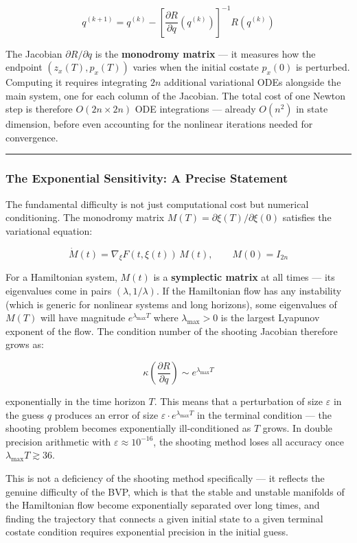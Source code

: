 \documentclass{article}
\begin{document}
$$q^{(k+1)} = q^{(k)} - \left[\frac{\partial R}{\partial q}(q^{(k)})\right]^{-1} R(q^{(k)})$$

\begin{tldrbox}
The Jacobian $\partial R / \partial q$ is the \textbf{monodromy matrix} — it measures how the endpoint $(z_x(T), p_x(T))$ varies when the initial costate $p_x(0)$ is perturbed. Computing it requires integrating $2n$ additional variational ODEs alongside the main system, one for each column of the Jacobian. The total cost of one Newton step is therefore $O(2n \times 2n)$ ODE integrations — already $O(n^2)$ in state dimension, before even accounting for the nonlinear iterations needed for convergence.
\end{tldrbox}

\medskip\hrule\medskip

\subsubsection{The Exponential Sensitivity: A Precise Statement}

\begin{compnumissuesbox}
The fundamental difficulty is not just computational cost but numerical conditioning. The monodromy matrix $M(T) = \partial \xi(T) / \partial \xi(0)$ satisfies the variational equation:

$$\dot{M}(t) = \nabla_\xi F(t, \xi(t))\, M(t), \qquad M(0) = I_{2n}$$

For a Hamiltonian system, $M(t)$ is a \textbf{symplectic matrix} at all times — its eigenvalues come in pairs $(\lambda, 1/\lambda)$. If the Hamiltonian flow has any instability (which is generic for nonlinear systems and long horizons), some eigenvalues of $M(T)$ will have magnitude $e^{\lambda_{\max} T}$ where $\lambda_{\max} > 0$ is the largest Lyapunov exponent of the flow. The condition number of the shooting Jacobian therefore grows as:

$$\kappa\left(\frac{\partial R}{\partial q}\right) \sim e^{\lambda_{\max} T}$$

exponentially in the time horizon $T$. This means that a perturbation of size $\varepsilon$ in the guess $q$ produces an error of size $\varepsilon \cdot e^{\lambda_{\max} T}$ in the terminal condition — the shooting problem becomes exponentially ill-conditioned as $T$ grows. In double precision arithmetic with $\varepsilon \approx 10^{-16}$, the shooting method loses all accuracy once $\lambda_{\max} T \gtrsim 36$.

This is not a deficiency of the shooting method specifically — it reflects the genuine difficulty of the BVP, which is that the stable and unstable manifolds of the Hamiltonian flow become exponentially separated over long times, and finding the trajectory that connects a given initial state to a given terminal costate condition requires exponential precision in the initial guess.
\end{compnumissuesbox}
\end{document}
